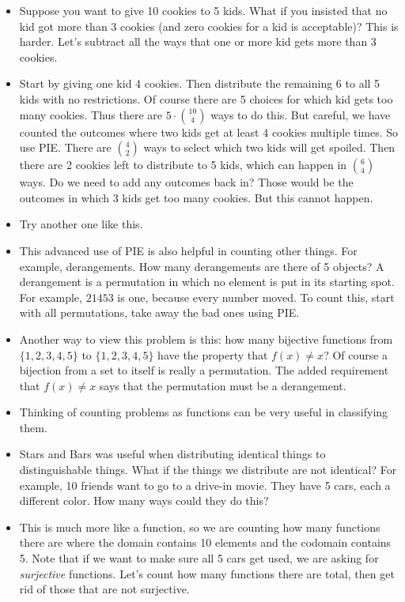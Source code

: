 \documentclass[12pt]{article}
\theoremstyle{plain}
\theoremstyle{definition}
\theoremstyle{remark}
\begin{document}
\begin{itemize}

\item Suppose you want to give 10 cookies to 5 kids.  What if you insisted that no kid got more than 3 cookies (and zero cookies for a kid is acceptable)?  This is harder.  Let's subtract all the ways that one or more kid gets more than 3 cookies.

\item Start by giving one kid 4 cookies.  Then distribute the remaining 6 to all 5 kids with no restrictions.  Of course there are 5 choices for which kid gets too many cookies.  Thus there are $5\cdot{10 \choose 4}$ ways to do this.  But careful, we have counted the outcomes where two kids get at least 4 cookies multiple times.  So use PIE.  There are ${4\choose 2}$ ways to select which two kids will get spoiled.  Then there are 2 cookies left to distribute to 5 kids, which can happen in ${6 \choose 4}$ ways.  Do we need to add any outcomes back in?  Those would be the outcomes in which 3 kids get too many cookies.  But this cannot happen.

\item Try another one like this.

\item This advanced use of PIE is also helpful in counting other things.  For example, derangements.   How many derangements are there of 5 objects?  A derangement is a permutation in which no element is put in its starting spot.  For example, $21453$ is one, because every number moved.  To count this, start with all permutations, take away the bad ones using PIE.

\item Another way to view this problem is this: how many bijective functions from $\{1,2,3,4,5\}$ to $\{1,2,3,4,5\}$ have the property that $f(x) \ne x$?  Of course a bijection from a set to itself is really a permutation.  The added requirement that $f(x) \ne x$ says that the permutation must be a derangement.

\item Thinking of counting problems as functions can be very useful in classifying them.

\item Stars and Bars was useful when distributing identical things to distinguishable things.  What if the things we distribute are not identical?  For example, 10 friends want to go to a drive-in movie.  They have 5 cars, each a different color.  How many ways could they do this?

\item This is much more like a function, so we are counting how many functions there are where the domain contains 10 elements and the codomain contains 5.  Note that if we want to make sure all 5 cars get used, we are asking for {\em surjective} functions.  Let's count how many functions there are total, then get rid of those that are not surjective.


\end{itemize}
\end{document}

